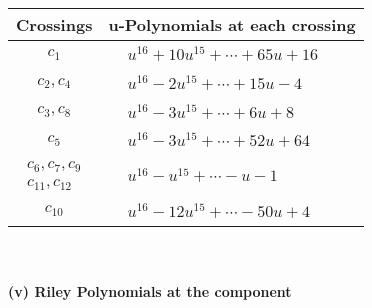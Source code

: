 \documentclass[1p]{elsarticle_modified}
\theoremstyle{definition}
\begin{document}
\begin{tabular}{m{50pt}|m{274pt}}
Crossings & \hspace{64pt}u-Polynomials at each crossing \\
\hline $$\begin{aligned}c_{1}\end{aligned}$$&$\begin{aligned}
&u^{16}+10 u^{15}+\cdots+65 u+16
\end{aligned}$\\
\hline $$\begin{aligned}c_{2},c_{4}\end{aligned}$$&$\begin{aligned}
&u^{16}-2 u^{15}+\cdots+15 u-4
\end{aligned}$\\
\hline $$\begin{aligned}c_{3},c_{8}\end{aligned}$$&$\begin{aligned}
&u^{16}-3 u^{15}+\cdots+6 u+8
\end{aligned}$\\
\hline $$\begin{aligned}c_{5}\end{aligned}$$&$\begin{aligned}
&u^{16}-3 u^{15}+\cdots+52 u+64
\end{aligned}$\\
\hline $$\begin{aligned}c_{6},c_{7},c_{9}\\c_{11},c_{12}\end{aligned}$$&$\begin{aligned}
&u^{16}- u^{15}+\cdots- u-1
\end{aligned}$\\
\hline $$\begin{aligned}c_{10}\end{aligned}$$&$\begin{aligned}
&u^{16}-12 u^{15}+\cdots-50 u+4
\end{aligned}$\\
\hline
\end{tabular}\\~\\
\newpage\renewcommand{\arraystretch}{1}
\flushleft \textbf{(v) Riley Polynomials at the component}\newline \\
\end{document}
